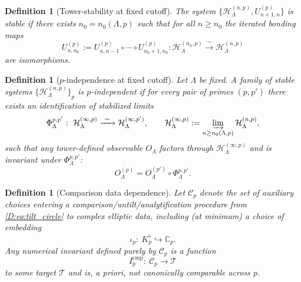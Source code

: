 \documentclass[11pt]{article}
\newtheorem{definition}[theorem]{Definition}
\theoremstyle{remark}
\begin{document}
{\begin{definition}[Tower-stability at fixed cutoff]\label{D:def:tower_stability}
The system $\{\mathcal H_{\Lambda}^{(n,p)},U^{(p)}_{n+1,n}\}$ is \emph{stable} if there exists $n_{0}=n_{0}(\Lambda,p)$ such that for all $n\ge n_{0}$ the iterated bonding maps
\begin{equation}
U^{(p)}_{n,n_{0}}
:=
U^{(p)}_{n,n-1}\circ \cdots \circ U^{(p)}_{n_{0}+1,n_{0}}
:\mathcal H_{\Lambda}^{(n_{0},p)}\xrightarrow{\ \sim\ }\mathcal H_{\Lambda}^{(n,p)}
\label{D:eq:U_stable}
\end{equation}
are isomorphisms.
\end{definition}

\begin{definition}[\texorpdfstring{$p$}{p}-independence at fixed cutoff]\label{D:def:p_indep}
Let $\Lambda$ be fixed.
A family of stable systems $\{\mathcal H_{\Lambda}^{(n,p)}\}_{p}$ is \emph{$p$-independent} if for every pair of primes $(p,p')$ there exists an identification of stabilized limits
\begin{equation}
\Phi_{\Lambda}^{p,p'}:\ \mathcal H_{\Lambda}^{(\infty,p)}\xrightarrow{\ \sim\ }\mathcal H_{\Lambda}^{(\infty,p')},
\qquad
\mathcal H_{\Lambda}^{(\infty,p)}:=\varinjlim_{n\ge n_{0}(\Lambda,p)}\mathcal H_{\Lambda}^{(n,p)},
\label{D:eq:pindep_iso}
\end{equation}
such that any tower-defined observable $O_{\Lambda}$ factors through $\mathcal H_{\Lambda}^{(\infty,p)}$ and is invariant under $\Phi_{\Lambda}^{p,p'}$:
\begin{equation}
O_{\Lambda}^{(p)} = O_{\Lambda}^{(p')}\circ \Phi_{\Lambda}^{p,p'}.
\label{D:eq:O_invariant}
\end{equation}
\end{definition} 
\begin{definition}[Comparison data dependence]\label{D:def:comparison_data}
Let $\mathcal C_{p}$ denote the set of auxiliary choices entering a comparison/untilt/analytification procedure from \eqref{D:eq:tilt_circle} to complex elliptic data, including (at minimum) a choice of embedding
\begin{equation}
\iota_{p}:\ K_{p}^{\flat}\hookrightarrow \mathbb C_{p}.
\label{D:eq:embed_choice}
\end{equation}
Any numerical invariant defined purely by $\mathcal C_{p}$ is a function
\begin{equation}
I_{p}^{\mathrm{cmp}}:\ \mathcal C_{p}\to \mathcal T
\label{D:eq:Icmp}
\end{equation}
to some target $\mathcal T$ and is, \emph{a priori}, not canonically comparable across $p$.
\end{definition}

}
\end{document}
